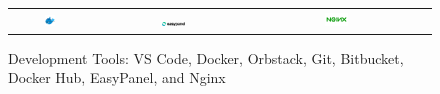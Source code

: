 \begin{figure}[H]
\begin{tabular}{cccc}
        \includegraphics[width=0.15\textwidth]{images/dockerhub-logo.png} &
        \includegraphics[width=0.15\textwidth]{images/easypanel-logo.png} &
        \includegraphics[width=0.15\textwidth]{images/nginx-logo.png}
    \end{tabular}
    \caption{Development Tools: VS Code, Docker, Orbstack, Git, Bitbucket, Docker Hub, EasyPanel, and Nginx}
\end{figure} 
